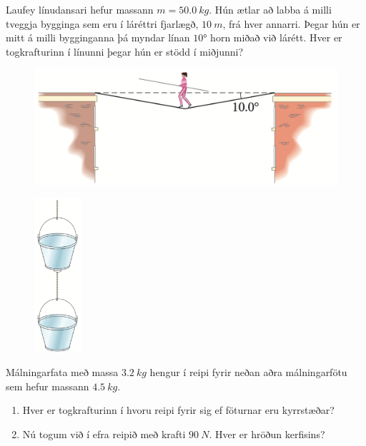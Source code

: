 \ifdefined \wholebook \else\documentclass[oneside]{book}\usepackage{EdlBook}\graphicspath{{figures/}}
\begin{document}
\begin{enumerate}[label = \textbf{Dæmi \thechapter.\arabic*.}]
\item Laufey línudansari hefur massann $m = \SI{50.0}{kg}$. Hún ætlar að labba á milli tveggja bygginga sem eru í láréttri fjarlægð, $\SI{10}{m}$, frá hver annarri. Þegar hún er mitt á milli bygginganna þá myndar línan $\ang{10}$ horn miðað við lárétt. Hver er togkrafturinn í línunni þegar hún er stödd í miðjunni?

\begin{figure}[H]
    \centering
    \includegraphics[scale = 0.4]{images/lina.png}
\end{figure}

\begin{minipage}{\linewidth}
\begin{figure}
\vspace{-4cm}
\includegraphics[width=0.7in]{images/fotur.png}
\end{figure}

\item Málningarfata með massa $\SI{3.2}{kg}$ hengur í reipi fyrir neðan aðra málningarfötu sem hefur massann $\SI{4.5}{kg}$.
\begin{enumerate}[label = \textbf{(\alph*)}]
    \item Hver er togkrafturinn í hvoru reipi fyrir sig ef föturnar eru kyrrstæðar? 
    \item Nú togum við í efra reipið með krafti $\SI{90}{N}$. Hver er hröðun kerfisins?
\end{enumerate}


\end{minipage}
\end{enumerate}
\end{document}
